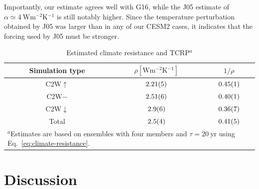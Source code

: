 \documentclass[draft]{agujournal2019}
\begin{document}
  Importantly, our estimate agrees well with G16, while the J05 estimate of \(\alpha
  \simeq \SI{4}{\watt\metre^{-2}\kelvin^{-1}}\) is still notably higher. Since the
  temperature perturbation obtained by J05 was larger than in any of our CESM2 cases, it
  indicates that the forcing used by J05 must be stronger. 

  \begin{table}
    \centering

    \caption{Estimated climate resistance and TCRP\(^{a}\)}\label{tab:trcp}%
    \begin{tabular}{ccc}
      \toprule
      Simulation type & \(\rho [\si{\watt\metre^{-2}\kelvin^{-1}}]\) & \(1/\rho\) \\
      \midrule
      C2W\(\uparrow\) & \(\num{2.21\pm0.05}\) & \(\num{0.45\pm0.01}\) \\
      C2W\(-\) & \(\num{2.51\pm0.06}\) & \(\num{0.40\pm0.01}\) \\
      C2W\(\downarrow\) & \(\num{2.9\pm0.6}\) & \(\num{0.36\pm0.07}\) \\
      Total & \(\num{2.5\pm0.4}\) & \(\num{0.41\pm0.05}\) \\
      \toprule
      \multicolumn{3}{l}{\parbox{\linewidth}{\(^{a}\)Estimates are based on ensembles with four members and \(\tau
          =\SI{20}{\mathrm{yr}}\) using Eq.~\ref{eq:climate-resistance}.}} \\
    \end{tabular}
  \end{table}

  \section{Discussion}

  \label{sec:discussion}

\end{document}
